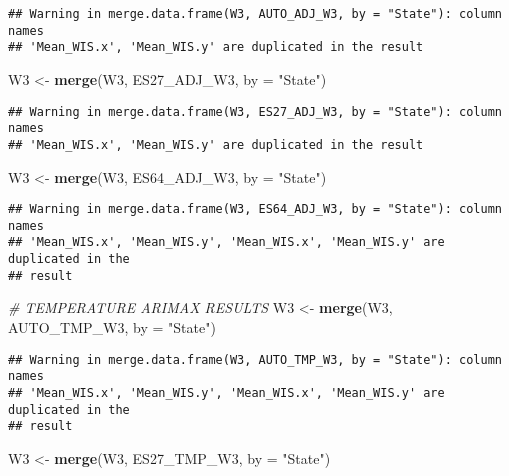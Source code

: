 \documentclass[
]{article}
\newenvironment{Shaded}{\begin{snugshade}}{\end{snugshade}}
\newcommand{\AttributeTok}[1]{\textcolor[rgb]{0.13,0.29,0.53}{#1}}
\newcommand{\CommentTok}[1]{\textcolor[rgb]{0.56,0.35,0.01}{\textit{#1}}}
\newcommand{\FunctionTok}[1]{\textcolor[rgb]{0.13,0.29,0.53}{\textbf{#1}}}
\newcommand{\NormalTok}[1]{#1}
\newcommand{\OtherTok}[1]{\textcolor[rgb]{0.56,0.35,0.01}{#1}}
\newcommand{\StringTok}[1]{\textcolor[rgb]{0.31,0.60,0.02}{#1}}
\begin{document}
\begin{verbatim}
## Warning in merge.data.frame(W3, AUTO_ADJ_W3, by = "State"): column names
## 'Mean_WIS.x', 'Mean_WIS.y' are duplicated in the result
\end{verbatim}

\begin{Shaded}
\begin{Highlighting}[]
\NormalTok{W3 }\OtherTok{\textless{}{-}} \FunctionTok{merge}\NormalTok{(W3, ES27\_ADJ\_W3, }\AttributeTok{by =} \StringTok{"State"}\NormalTok{)}
\end{Highlighting}
\end{Shaded}

\begin{verbatim}
## Warning in merge.data.frame(W3, ES27_ADJ_W3, by = "State"): column names
## 'Mean_WIS.x', 'Mean_WIS.y' are duplicated in the result
\end{verbatim}

\begin{Shaded}
\begin{Highlighting}[]
\NormalTok{W3 }\OtherTok{\textless{}{-}} \FunctionTok{merge}\NormalTok{(W3, ES64\_ADJ\_W3, }\AttributeTok{by =} \StringTok{"State"}\NormalTok{)}
\end{Highlighting}
\end{Shaded}

\begin{verbatim}
## Warning in merge.data.frame(W3, ES64_ADJ_W3, by = "State"): column names
## 'Mean_WIS.x', 'Mean_WIS.y', 'Mean_WIS.x', 'Mean_WIS.y' are duplicated in the
## result
\end{verbatim}

\begin{Shaded}
\begin{Highlighting}[]
\CommentTok{\# TEMPERATURE ARIMAX RESULTS}
\NormalTok{W3 }\OtherTok{\textless{}{-}} \FunctionTok{merge}\NormalTok{(W3, AUTO\_TMP\_W3, }\AttributeTok{by =} \StringTok{"State"}\NormalTok{)}
\end{Highlighting}
\end{Shaded}

\begin{verbatim}
## Warning in merge.data.frame(W3, AUTO_TMP_W3, by = "State"): column names
## 'Mean_WIS.x', 'Mean_WIS.y', 'Mean_WIS.x', 'Mean_WIS.y' are duplicated in the
## result
\end{verbatim}

\begin{Shaded}
\begin{Highlighting}[]
\NormalTok{W3 }\OtherTok{\textless{}{-}} \FunctionTok{merge}\NormalTok{(W3, ES27\_TMP\_W3, }\AttributeTok{by =} \StringTok{"State"}\NormalTok{)}
\end{Highlighting}
\end{Shaded}
\end{document}
